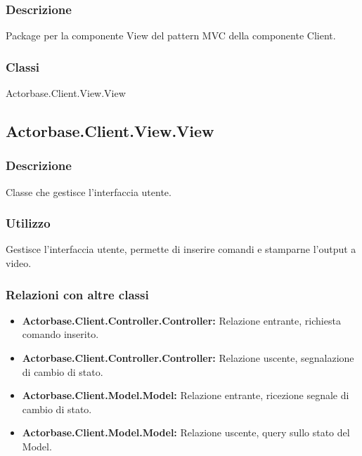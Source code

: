 \documentclass[a4paper]{article}
\begin{document}
			\subsubsection{Descrizione}
				Package per la componente View del pattern MVC della componente Client.
			\subsubsection{Classi}
				Actorbase.Client.View.View

		
		\subsection{Actorbase.Client.View.View}	
			\subsubsection{Descrizione}
				Classe che gestisce l'interfaccia utente.
			\subsubsection{Utilizzo}
				Gestisce l'interfaccia utente, permette di inserire comandi e stamparne l'output a video.
			\subsubsection{Relazioni con altre classi}
				\begin{itemize}
					\item \textbf{Actorbase.Client.Controller.Controller:} Relazione entrante, richiesta comando inserito.
					\item \textbf{Actorbase.Client.Controller.Controller:} Relazione uscente, segnalazione di cambio di stato.
					\item \textbf{Actorbase.Client.Model.Model:} Relazione entrante, ricezione segnale di cambio di stato.
					\item \textbf{Actorbase.Client.Model.Model:} Relazione uscente, query sullo stato del Model.
				\end{itemize}
				
				
				
\end{document}
